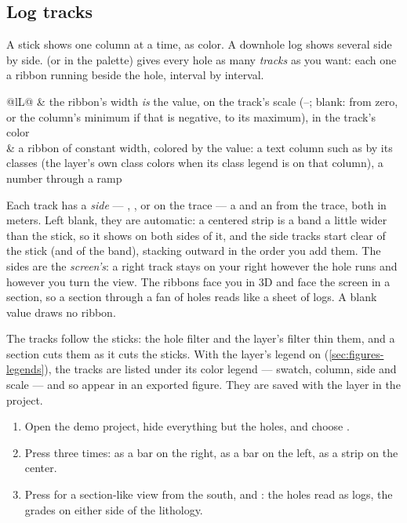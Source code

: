 \subsection{Log tracks}\label{sec:dh-logs}
A stick shows one column at a time, as color. A downhole log shows several side by side.  (or  in the palette) gives every hole as many \emph{tracks} as you want: each one a ribbon running beside the hole, interval by interval.

\begin{center}
\begin{tabularx}{\linewidth}{@{}lL@{}}\toprule
{} & the ribbon's width \emph{is} the value, on the track's scale (–; blank: from zero, or the column's minimum if that is negative, to its maximum), in the track's color \\
 & a ribbon of constant width, colored by the value: a text column such as  by its classes (the layer's own class colors when its class legend is on that column), a number through a ramp \\ \bottomrule
\end{tabularx}
\end{center}

Each track has a \emph{side} — , , or  on the trace — a  and an  from the trace, both in meters. Left blank, they are automatic: a centered strip is a band a little wider than the stick, so it shows on both sides of it, and the side tracks start clear of the stick (and of the band), stacking outward in the order you add them. The sides are the \emph{screen's}: a right track stays on your right however the hole runs and however you turn the view. The ribbons face you in 3D and face the screen in a section, so a section through a fan of holes reads like a sheet of logs. A blank value draws no ribbon.

The tracks follow the sticks: the hole filter and the layer's filter thin them, and a section cuts them as it cuts the sticks. With the layer's legend on (\cref{sec:figures-legends}), the tracks are listed under its color legend — swatch, column, side and scale — and so appear in an exported figure. They are saved with the layer in the project.

\begin{tryit}
\begin{enumerate}
\item Open the demo project, hide everything but the holes, and choose .
\item Press  three times:  as a bar on the right,  as a bar on the left,  as a strip on the center.
\item Press  for a section-like view from the south, and : the holes read as logs, the grades on either side of the lithology.
\end{enumerate}
\end{tryit}

